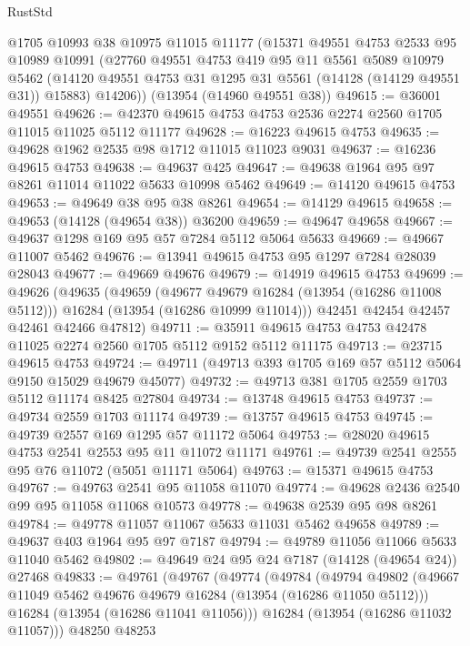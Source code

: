 \begin{lexlean}{RustStd}
\begin{coremodule}
    @1705
    @10993
    @38
    @10975
    @11015
    @11177
    (@15371
      @49551
      @4753
      @2533
      @95
      @10989
      @10991
      (@27760
        @49551
        @4753
        @419
        @95
        @11
        @5561
        @5089
        @10979
        @5462
        (@14120 @49551 @4753 @31 @1295 @31 @5561 (@14128 (@14129 @49551 @31)) @15883)
        @14206))
    (@13954 (@14960 @49551 @38))
@49615 := @36001 @49551
@49626 := @42370 @49615 @4753 @4753 @2536 @2274 @2560 @1705 @11015 @11025 @5112 @11177
@49628 := @16223 @49615 @4753
@49635 := @49628 @1962 @2535 @98 @1712 @11015 @11023 @9031
@49637 := @16236 @49615 @4753
@49638 := @49637 @425
@49647 := @49638 @1964 @95 @97 @8261 @11014 @11022 @5633 @10998 @5462
@49649 := @14120 @49615 @4753
@49653 := @49649 @38 @95 @38 @8261
@49654 := @14129 @49615
@49658 := @49653 (@14128 (@49654 @38)) @36200
@49659 := @49647 @49658
@49667 := @49637 @1298 @169 @95 @57 @7284 @5112 @5064 @5633
@49669 := @49667 @11007 @5462
@49676 := @13941 @49615 @4753 @95 @1297 @7284 @28039 @28043
@49677 := @49669 @49676
@49679 := @14919 @49615 @4753
@49699 := @49626
    (@49635
      (@49659
        (@49677 @49679 @16284 (@13954 (@16286 @11008 @5112)))
        @16284
        (@13954 (@16286 @10999 @11014)))
      @42451
      @42454
      @42457
      @42461
      @42466
      @47812)
@49711 := @35911 @49615 @4753 @4753 @42478 @11025 @2274 @2560 @1705 @5112 @9152 @5112 @11175
@49713 := @23715 @49615 @4753
@49724 := @49711 (@49713 @393 @1705 @169 @57 @5112 @5064 @9150 @15029 @49679 @45077)
@49732 := @49713 @381 @1705 @2559 @1703 @5112 @11174 @8425 @27804
@49734 := @13748 @49615 @4753
@49737 := @49734 @2559 @1703 @11174
@49739 := @13757 @49615 @4753
@49745 := @49739 @2557 @169 @1295 @57 @11172 @5064
@49753 := @28020 @49615 @4753 @2541 @2553 @95 @11 @11072 @11171
@49761 := @49739 @2541 @2555 @95 @76 @11072 (@5051 @11171 @5064)
@49763 := @15371 @49615 @4753
@49767 := @49763 @2541 @95 @11058 @11070
@49774 := @49628 @2436 @2540 @99 @95 @11058 @11068 @10573
@49778 := @49638 @2539 @95 @98 @8261
@49784 := @49778 @11057 @11067 @5633 @11031 @5462 @49658
@49789 := @49637 @403 @1964 @95 @97 @7187
@49794 := @49789 @11056 @11066 @5633 @11040 @5462
@49802 := @49649 @24 @95 @24 @7187 (@14128 (@49654 @24)) @27468
@49833 := @49761
    (@49767
      (@49774
        (@49784
          (@49794
            @49802
            (@49667 @11049 @5462 @49676 @49679 @16284 (@13954 (@16286 @11050 @5112)))
            @16284
            (@13954 (@16286 @11041 @11056)))
          @16284
          (@13954 (@16286 @11032 @11057)))
        @48250
        @48253

\end{coremodule}
\end{lexlean}
